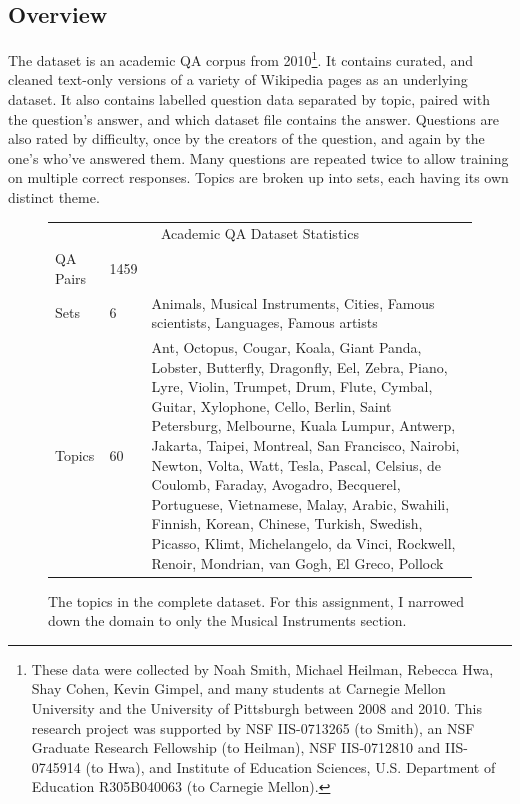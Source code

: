 \documentclass[twoside]{article}
\begin{document}
\subsection{Overview}

The dataset is an academic QA corpus from 2010\footnote{These data were collected by Noah Smith, Michael Heilman, Rebecca Hwa, Shay Cohen, Kevin Gimpel, and many students at Carnegie Mellon University and the University of Pittsburgh between 2008 and 2010. This research project was supported by NSF IIS-0713265 (to Smith), an NSF Graduate Research Fellowship (to Heilman), NSF IIS-0712810 and IIS-0745914 (to Hwa), and Institute of Education Sciences, U.S. Department of Education R305B040063 (to Carnegie Mellon).}.  It contains curated, and cleaned text-only versions of a variety of Wikipedia pages as an underlying dataset.  It also contains labelled question data separated by topic, paired with the question's answer, and which dataset file contains the answer.  Questions are also rated by difficulty, once by the creators of the question, and again by the one's who've answered them.  Many questions are repeated twice to allow training on multiple correct responses.  Topics are broken up into sets, each having its own distinct theme.


\begin{figure}
\caption{The topics in the complete dataset.  For this assignment, I narrowed down the domain to only the Musical Instruments section. \label{fig:datastat}}
\begin{tabular}{|l|l|p{11.5cm}|}
\hline
\multicolumn{3}{|c|}{Academic QA Dataset Statistics} \\
QA Pairs & 1459 & \\ \hline
Sets & 6 & {\color{applegreen}Animals}, {\color{azure}Musical Instruments}, {\color{auburn}Cities}, {\color{americanrose}Famous scientists}, {\color{orange}Languages}, {\color{black}Famous artists}\\ \hline
Topics & 60 & {\color{applegreen}Ant, Octopus, Cougar, Koala, Giant Panda, Lobster, Butterfly, Dragonfly, Eel, Zebra}, {\color{azure}Piano, Lyre, Violin, Trumpet, Drum, Flute, Cymbal, Guitar, Xylophone, Cello,} {\color{auburn}Berlin, Saint Petersburg, Melbourne, Kuala Lumpur, Antwerp, Jakarta, Taipei, Montreal, San Francisco, Nairobi,} {\color{americanrose}Newton, Volta, Watt, Tesla, Pascal, Celsius, de Coulomb, Faraday,  Avogadro, Becquerel}, {\color{orange}Portuguese, Vietnamese, Malay, Arabic, Swahili, Finnish, Korean, Chinese, Turkish, Swedish,} {\color{black}Picasso, Klimt, Michelangelo, da Vinci, Rockwell, Renoir, Mondrian, van Gogh, El Greco, Pollock} \\ \hline
\end{tabular}
\end{figure}
\end{document}
